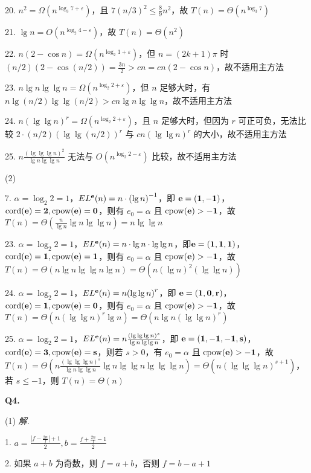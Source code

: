 \documentclass[UTF8]{ctexart}
\begin{document}
20. $n^2=\Omega(n^{\log_{3}7+\varepsilon})$，且 $7{(n/3)}^2\leqslant\frac{8}{9}n^2$，故 $T(n)=\Theta(n^{\log_{3}7})$

21. $\lg n=O(n^{\log_{2}4-\varepsilon})$，故 $T(n)=\Theta(n^2)$

22. $n(2-\cos n)=\Omega(n^{\log_{2}1+\varepsilon})$，但 $n=(2k+1)\pi$ 时 $(n/2)(2-\cos(n/2))=\frac{3n}{2}>cn=cn(2-\cos n)$，故不适用主方法

23. $n\lg n\lg\lg n=\Omega(n^{\log_{2}2+\varepsilon})$，但 $n$ 足够大时，有 $n\lg (n/2)\lg\lg(n/2)>cn\lg n\lg\lg n$，故不适用主方法

24. $n{(\lg\lg n)}^r=\Omega(n^{\log_{2}2+\varepsilon})$，且 $n$ 足够大时，但因为 $r$ 可正可负，无法比较 $2\cdot(n/2){(\lg\lg(n/2))}^r$ 与 $cn{(\lg\lg n)}^r$ 的大小，故不适用主方法

25. $n\frac{{(\lg\lg\lg n)}^2}{\lg n\lg\lg n}$ 无法与 $O(n^{\log_{2}2-\varepsilon})$ 比较，故不适用主方法

(2)

7. $\alpha=\log_{2}2=1$，$EL^{\bf{e}}(n)=n\cdot{(\lg n)}^{-1}$，即 $\bf{e}=(1,-1)$，${\rm cord}(\bf{e})=2,{\rm cpow}(\bf{e})=0$，则有 $e_0=\alpha$ 且 ${\rm cpow}(\bf{e})>-1$，故 $T(n)=\Theta(\frac{n}{\lg n}\lg n\lg \lg n)=n\lg\lg n$

23. $\alpha=\log_{2}2=1$，$EL^{\bf{e}}(n)=n\cdot\lg n\cdot\lg\lg n$，即$\bf{e}=(1,1,1)$，${\rm cord}(\bf{e})=1,{\rm cpow}(\bf{e})=1$，则有 $e_0=\alpha$ 且 ${\rm cpow}(\bf{e})>-1$，故 $T(n)=\Theta(n\lg n\lg\lg n\lg n)=\Theta(n{(\lg n)}^2(\lg\lg n))$

24. $\alpha=\log_{2}2=1$，$EL^{\bf{e}}(n)=n{(\lg\lg n)}^r$，即 $\bf{e}=(1,0,r)$，${\rm cord}(\bf{e})=1,{\rm cpow}(\bf{e})=0$，则有 $e_0=\alpha$ 且 ${\rm cpow}(\bf{e})>-1$，故 $T(n)=\Theta(n{(\lg\lg n)}^r\lg n)=\Theta(n\lg n{(\lg\lg n)}^r)$

25. $\alpha=\log_{2}2=1$，$EL^{\bf{e}}(n)=n\frac{{(\lg\lg\lg n)}^s}{\lg n\lg\lg n}$，即 $\bf{e}=(1,-1,-1,s)$，${\rm cord}(\bf{e})=3,{\rm cpow}(\bf{e})=s$，则若 $s>0$，有 $e_0=\alpha$ 且 ${\rm cpow}(\bf{e})>-1$，故 $T(n)=\Theta(n\frac{{(\lg\lg\lg n)}^s}{\lg n\lg\lg n}\lg n\lg\lg n\lg\lg\lg n)=\Theta(n{(\lg\lg\lg n)}^{s+1})$，若 $s\leqslant-1$，则 $T(n)=\Theta(n)$

\hrulefill\medskip

\textbf{Q4.}

(1) \textit{解.}

1. $a=\frac{|f-\frac{2n}{f}|+1}{2},b=\frac{f+\frac{2n}{f}-1}{2}$

2. 如果 $a+b$ 为奇数，则 $f=a+b$，否则 $f=b-a+1$
\end{document}
